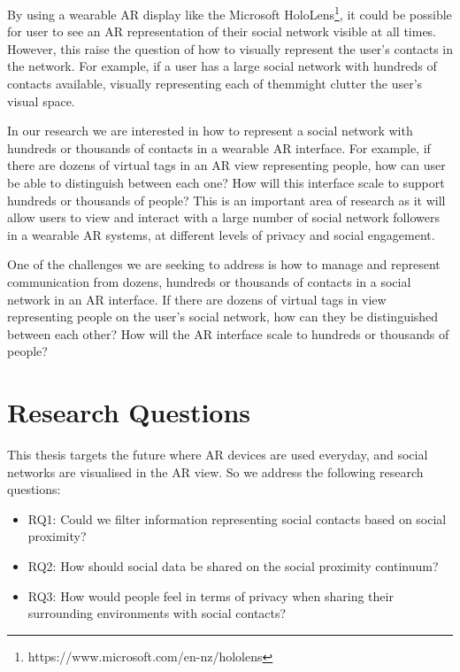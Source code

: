 By using a wearable AR display like the Microsoft HoloLens\footnote{https://www.microsoft.com/en-nz/hololens}, it could be possible for user to see an AR representation of their social network visible at all times. However, this raise the question of how to visually represent the user's contacts in the network. For example, if a user has a large social network with hundreds of contacts available, visually representing each of themmight clutter the user's visual space.

In our research we are interested in how to represent a social network with hundreds or thousands of contacts in a wearable AR interface. For example, if there are dozens of virtual tags in an AR view representing people, how can user be able to distinguish between each one? How will this interface scale to support hundreds or thousands of people? This is an important area of research as it will allow users to view and interact with a large number of social network followers in a wearable AR systems, at different levels of privacy and social engagement.

One of the challenges we are seeking to address is how to manage and represent communication from dozens, hundreds or thousands of contacts in a social network in an AR interface. If there are dozens of virtual tags in view representing people on the user's social network, how can they be distinguished between each other? How will the AR interface scale to hundreds or thousands of people?

\section{Research Questions}

This thesis targets the future where AR devices are used everyday, and social networks are visualised in the AR view. So we address the following research questions: 

\begin{itemize}
    \item RQ1: Could we filter information representing social contacts based on social proximity?
    \item RQ2: How should social data be shared on the social proximity continuum?
    \item RQ3: How would people feel in terms of privacy when sharing their surrounding environments with social contacts?
\end{itemize}


